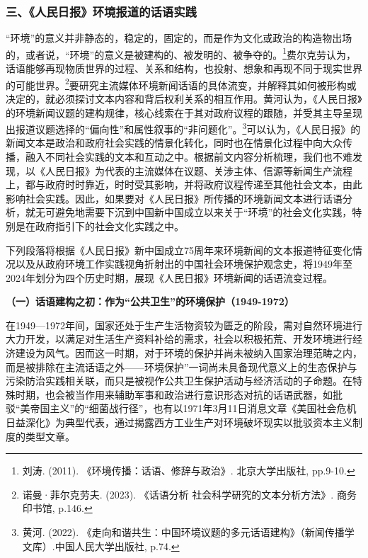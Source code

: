 \subsubsection{三、《人民日报》环境报道的话语实践}\label{ux4e09ux4ebaux6c11ux65e5ux62a5ux73afux5883ux62a5ux9053ux7684ux8bddux8bedux5b9eux8df5}

``环境''的意义并非静态的，稳定的，固定的，而是作为文化或政治的构造物出场的，或者说，``环境''的意义是被建构的、被发明的、被争夺的。\footnote{刘涛.
  (2011). 《环境传播：话语、修辞与政治》. 北京大学出版社, pp.9-10.}费尔克劳认为，话语能够再现物质世界的过程、关系和结构，也投射、想象和再现不同于现实世界的可能世界。\footnote{诺曼·菲尔克劳夫.
  (2023). 《话语分析 社会科学研究的文本分析方法》. 商务印书馆, p.146.}要研究主流媒体环境新闻话语的具体流变，并解释其如何被形构或决定的，就必须探讨文本内容和背后权利关系的相互作用。黄河认为，《人民日报》的环境新闻议题的建构规律，核心线索在于其对政府议程的跟随，并受其主导呈现出报道议题选择的``偏向性''和属性叙事的``非问题化''。\footnote{黄河.
  (2022).
  《走向和谐共生：中国环境议题的多元话语建构》（新闻传播学文库）.中国人民大学出版社,
  p.74.}可以认为，《人民日报》的新闻文本是政治和政府社会实践的情景化转化，同时也在情景化过程中向大众传播，融入不同社会实践的文本和互动之中。根据前文内容分析梳理，我们也不难发现，以《人民日报》为代表的主流媒体在议题、关涉主体、信源等新闻生产流程上，都与政府时时靠近，时时受其影响，并将政府议程传递至其他社会文本，由此影响社会实践。因此，如果要对《人民日报》所传播的环境新闻文本进行话语分析，就无可避免地需要下沉到中国新中国成立以来关于``环境''的社会文化实践，特别是在政府指引下的社会文化实践之中。

下列段落将根据《人民日报》新中国成立75周年来环境新闻的文本报道特征变化情况以及从政府环境工作实践视角折射出的中国社会环境保护观念史，将1949年至2024年划分为四个历史时期，展现《人民日报》环境新闻的话语流变过程。

\textbf{（一）话语建构之初：作为``公共卫生''的环境保护（1949-1972）}

在1949---1972年间，国家还处于生产生活物资较为匮乏的阶段，需对自然环境进行大力开发，以满足对生活生产资料补给的需求，社会以积极拓荒、开发环境进行经济建设为风气。因而这一时期，对于环境的保护并尚未被纳入国家治理范畴之内，而是被排除在主流话语之外------环境保护''一词尚未具备现代意义上的生态保护与污染防治实践相关联，而只是被视作公共卫生保护活动与经济活动的子命题。在特殊时期，也会被当作用来辅助军事和政治进行意识形态对抗的话语武器，如批驳``美帝国主义''的``细菌战行径''，也有以1971年3月11日消息文章《美国社会危机日益深化》为典型代表，通过揭露西方工业生产对环境破坏现实以批驳资本主义制度的类型文章。

